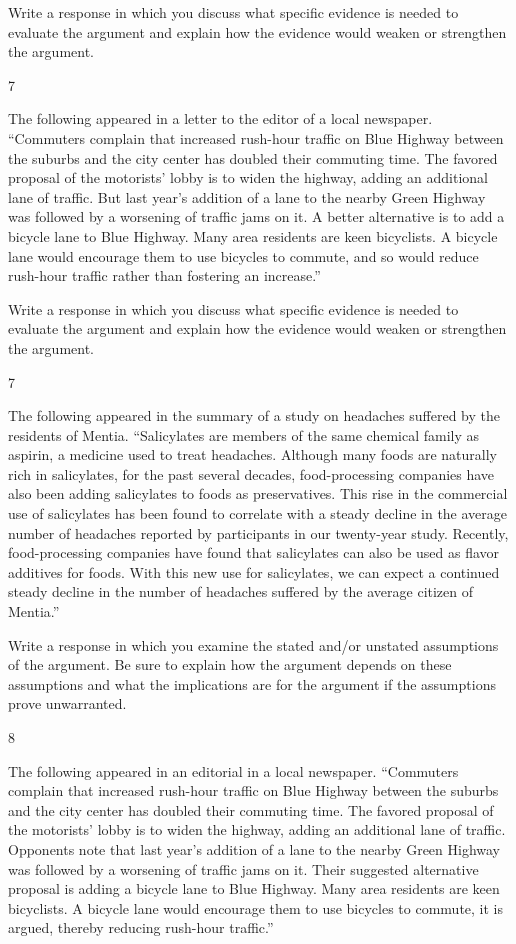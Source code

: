 \documentclass[]{article}
\begin{document}
Write a response in which you discuss what specific evidence is needed
to evaluate the argument and explain how the evidence would weaken or
strengthen the argument.

7

The following appeared in a letter to the editor of a local newspaper.
``Commuters complain that increased rush-hour traffic on Blue Highway
between the suburbs and the city center has doubled their commuting
time. The favored proposal of the motorists' lobby is to widen the
highway, adding an additional lane of traffic. But last year's addition
of a lane to the nearby Green Highway was followed by a worsening of
traffic jams on it. A better alternative is to add a bicycle lane to
Blue Highway. Many area residents are keen bicyclists. A bicycle lane
would encourage them to use bicycles to commute, and so would reduce
rush-hour traffic rather than fostering an increase.''

Write a response in which you discuss what specific evidence is needed
to evaluate the argument and explain how the evidence would weaken or
strengthen the argument.

7

The following appeared in the summary of a study on headaches suffered
by the residents of Mentia. ``Salicylates are members of the same
chemical family as aspirin, a medicine used to treat headaches. Although
many foods are naturally rich in salicylates, for the past several
decades, food-processing companies have also been adding salicylates to
foods as preservatives. This rise in the commercial use of salicylates
has been found to correlate with a steady decline in the average number
of headaches reported by participants in our twenty-year study.
Recently, food-processing companies have found that salicylates can also
be used as flavor additives for foods. With this new use for
salicylates, we can expect a continued steady decline in the number of
headaches suffered by the average citizen of Mentia.''

Write a response in which you examine the stated and/or unstated
assumptions of the argument. Be sure to explain how the argument depends
on these assumptions and what the implications are for the argument if
the assumptions prove unwarranted.

8

The following appeared in an editorial in a local newspaper. ``Commuters
complain that increased rush-hour traffic on Blue Highway between the
suburbs and the city center has doubled their commuting time. The
favored proposal of the motorists' lobby is to widen the highway, adding
an additional lane of traffic. Opponents note that last year's addition
of a lane to the nearby Green Highway was followed by a worsening of
traffic jams on it. Their suggested alternative proposal is adding a
bicycle lane to Blue Highway. Many area residents are keen bicyclists. A
bicycle lane would encourage them to use bicycles to commute, it is
argued, thereby reducing rush-hour traffic.''
\end{document}
